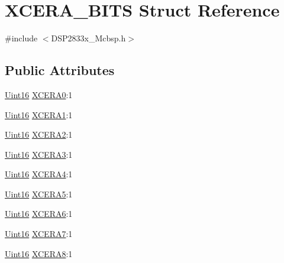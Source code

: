 \hypertarget{struct_x_c_e_r_a___b_i_t_s}{}\section{X\+C\+E\+R\+A\+\_\+\+B\+I\+T\+S Struct Reference}
\label{struct_x_c_e_r_a___b_i_t_s}


{\ttfamily \#include $<$D\+S\+P2833x\+\_\+\+Mcbsp.\+h$>$}

\subsection*{Public Attributes}
\begin{DoxyCompactItemize}
\item 
\hyperlink{_d_s_p2833x___device_8h_a59a9f6be4562c327cbfb4f7e8e18f08b}{Uint16} \hyperlink{struct_x_c_e_r_a___b_i_t_s_affe74fd63be2261d18c675c831514f7d}{X\+C\+E\+R\+A0}\+:1
\item 
\hyperlink{_d_s_p2833x___device_8h_a59a9f6be4562c327cbfb4f7e8e18f08b}{Uint16} \hyperlink{struct_x_c_e_r_a___b_i_t_s_a38c83387da8ba9a14e437f88b74fef4f}{X\+C\+E\+R\+A1}\+:1
\item 
\hyperlink{_d_s_p2833x___device_8h_a59a9f6be4562c327cbfb4f7e8e18f08b}{Uint16} \hyperlink{struct_x_c_e_r_a___b_i_t_s_aa469a753abe52d7d9204605002f7cafd}{X\+C\+E\+R\+A2}\+:1
\item 
\hyperlink{_d_s_p2833x___device_8h_a59a9f6be4562c327cbfb4f7e8e18f08b}{Uint16} \hyperlink{struct_x_c_e_r_a___b_i_t_s_ad1e3e874cf6ce79418903ac29b3c2f94}{X\+C\+E\+R\+A3}\+:1
\item 
\hyperlink{_d_s_p2833x___device_8h_a59a9f6be4562c327cbfb4f7e8e18f08b}{Uint16} \hyperlink{struct_x_c_e_r_a___b_i_t_s_a451dea94fa48732f5582615c6ba934c2}{X\+C\+E\+R\+A4}\+:1
\item 
\hyperlink{_d_s_p2833x___device_8h_a59a9f6be4562c327cbfb4f7e8e18f08b}{Uint16} \hyperlink{struct_x_c_e_r_a___b_i_t_s_a056d2b3650bde03103de57428664fce7}{X\+C\+E\+R\+A5}\+:1
\item 
\hyperlink{_d_s_p2833x___device_8h_a59a9f6be4562c327cbfb4f7e8e18f08b}{Uint16} \hyperlink{struct_x_c_e_r_a___b_i_t_s_a539d02807ac20f0d3744a0a9f55f2f2d}{X\+C\+E\+R\+A6}\+:1
\item 
\hyperlink{_d_s_p2833x___device_8h_a59a9f6be4562c327cbfb4f7e8e18f08b}{Uint16} \hyperlink{struct_x_c_e_r_a___b_i_t_s_ae2ccf3d1dfe5cfe1809d55270e5cb08f}{X\+C\+E\+R\+A7}\+:1
\item 
\hyperlink{_d_s_p2833x___device_8h_a59a9f6be4562c327cbfb4f7e8e18f08b}{Uint16} \hyperlink{struct_x_c_e_r_a___b_i_t_s_acf9d9b88fae7bbdba1275f7a98177a06}{X\+C\+E\+R\+A8}\+:1

\end{DoxyCompactItemize}
